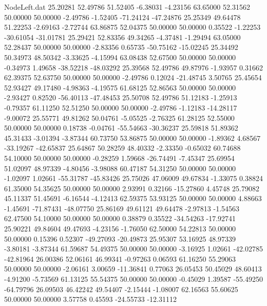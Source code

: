 \begin{filecontents}{NodeLeft.dat}
  25.20281   52.49786   51.52405    -6.38031   -4.23156   63.65000   52.31562   50.00000   50.00000   -2.49786   -1.52405  -71.24124  -47.24876
  25.25349   49.64478   51.22253    -2.69163   -2.72744   63.86875   52.04375   50.00000   50.00000    0.35522   -1.22253  -30.61054  -31.01781
  25.29421   52.83356   49.34265    -4.37481   -1.29494   63.05000   52.28437   50.00000   50.00000   -2.83356    0.65735  -50.75162  -15.02245
  25.34492   50.34973   48.50342    -3.33625   -4.15994   63.08438   52.67500   50.00000   50.00000   -0.34973    1.49658  -38.52218  -48.03292
  25.39568   52.49786   49.87976    -1.93957    0.31662   62.39375   52.63750   50.00000   50.00000   -2.49786    0.12024  -21.48745    3.50765
  25.45654   52.93427   49.17480    -4.98363   -4.19575   61.68125   52.86563   50.00000   50.00000   -2.93427    0.82520  -56.40113  -47.48453
  25.50708   52.49786   51.12183    -1.25913   -0.79357   61.11250   52.51250   50.00000   50.00000   -2.49786   -1.12183  -14.28117   -9.00072
  25.55771   49.81262   50.04761    -5.05525   -2.76325   61.28125   52.55000   50.00000   50.00000    0.18738   -0.04761  -55.54663  -30.36237
  25.59818   51.89362   45.31433    -3.01394   -3.87344   60.73750   53.86875   50.00000   50.00000   -1.89362    4.68567  -33.19267  -42.65837
  25.64867   50.28259   48.40332    -2.33350   -0.65032   60.74688   54.10000   50.00000   50.00000   -0.28259    1.59668  -26.74491   -7.45347
  25.69954   51.02097   48.97339    -4.80456   -3.98088   60.47187   54.31250   50.00000   50.00000   -1.02097    1.02661  -55.31787  -45.83426
  25.75026   47.06009   49.67834    -1.33075    0.38824   61.35000   54.35625   50.00000   50.00000    2.93991    0.32166  -15.27860    4.45748
  25.79082   45.11337   51.45691    -6.16544   -4.12413   62.59375   53.93125   50.00000   50.00000    4.88663   -1.45691  -71.87431  -48.07750
  25.86169   49.61121   49.64478    -2.97813   -1.54563   62.47500   54.10000   50.00000   50.00000    0.38879    0.35522  -34.54263  -17.92741
  25.90221   49.84604   49.47693    -4.23156   -1.76050   62.50000   54.22813   50.00000   50.00000    0.15396    0.52307  -49.27093  -20.49873
  25.95307   53.16925   48.97339    -3.80181   -3.87344   61.59687   54.49375   50.00000   50.00000   -3.16925    1.02661  -42.02785  -42.81964
  26.00386   52.06161   46.99341    -0.97263    0.06593   61.16250   55.29063   50.00000   50.00000   -2.06161    3.00659  -11.36841    0.77063
  26.05453   50.45029   48.60413    -4.91200   -5.73569   61.13125   55.54375   50.00000   50.00000   -0.45029    1.39587  -55.49250  -64.79796
  26.09503   46.42242   49.54407    -2.15444   -1.08007   62.16563   55.60625   50.00000   50.00000    3.57758    0.45593  -24.55733  -12.31112

\end{filecontents}
